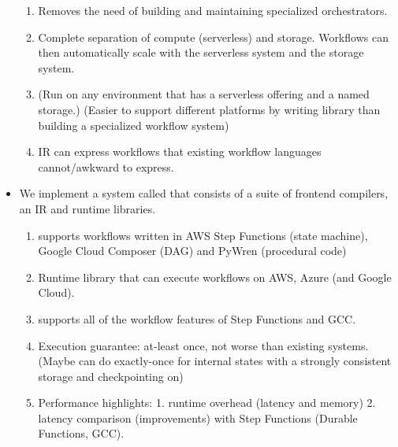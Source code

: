 \begin{itemize}
\begin{enumerate}
      \item Removes the need of building and maintaining specialized
      orchestrators.

      \item Complete separation of compute (serverless) and storage. Workflows
      can then automatically scale with the serverless system and the storage
      system.

      \item (Run on any environment that has a serverless offering and a named
      storage.) (Easier to support different platforms by writing library than
      building a specialized workflow system)

      \item IR can express workflows that existing workflow languages
      cannot/awkward to express.

    \end{enumerate}

  \item We implement a system called \name{} that consists of a suite of
  frontend compilers, an IR and runtime libraries.

  \begin{enumerate}
    \item supports workflows written in AWS Step Functions (state machine),
  Google Cloud Composer (DAG) and PyWren (procedural code)

    \item Runtime library that can execute workflows on AWS, Azure (and Google Cloud).

    \item supports all of the workflow features of Step Functions and GCC.

    \item Execution guarantee: at-least once, not worse than existing systems.
  (Maybe can do exactly-once for internal states with a strongly consistent
  storage and checkpointing on)

    \item Performance highlights: 1. runtime overhead (latency and memory) 2.
    latency comparison (improvements) with Step Functions (Durable Functions,
    GCC).
  \end{enumerate}

\end{itemize}






